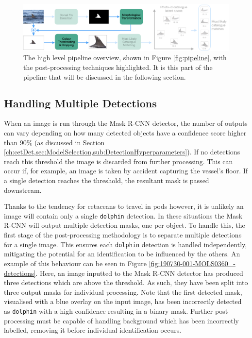 \begin{figure}[!h]
	\begin{center}
		\includegraphics[width=\linewidth]{Chapter3/figs/pipeline-post-processed.png}
	\end{center}
	\caption[The high level pipeline overview, shown in Figure \ref{fig:pipeline}, with the post-processing techniques highlighted.]{The high level pipeline overview, shown in Figure \ref{fig:pipeline}, with the post-processing techniques highlighted. It is this part of the pipeline that will be discussed in the following section.}
	\label{fig:pipeline-post-processed}
\end{figure}

\subsection{Handling Multiple Detections}\label{ch:cetDet,sec:postProcessing,sub:handlingMultipleDetections}

When an image is run through the Mask R-CNN detector, the number of outputs can vary depending on how many detected objects have a confidence score higher than 90\% (as discussed in Section \ref{ch:cetDet,sec:ModelSelection,sub:DetectionHyperparameters}). If no detections reach this threshold the image is discarded from further processing. This can occur if, for example, an image is taken by accident capturing the vessel's floor. If a single detection reaches the threshold, the resultant mask is passed downstream. 

Thanks to the tendency for cetaceans to travel in pods however, it is unlikely an image will contain only a single \texttt{dolphin} detection. In these situations the Mask R-CNN will output multiple detection masks, one per object. To handle this, the first stage of the post-processing methodology is to separate multiple detections for a single image. This ensures each \texttt{dolphin} detection is handled independently, mitigating the potential for an identification to be influenced by the others. An example of this behaviour can be seen in Figure \ref{fig:190730-001-MOLS0360_-detections}. Here, an image inputted to the Mask R-CNN detector has produced three detections which are above the threshold. As such, they have been split into three output masks for individual processing. Note that the first detected mask, visualised with a blue overlay on the input image, has been incorrectly detected as \texttt{dolphin} with a high confidence resulting in a binary mask. Further post-processing must be capable of handling background which has been incorrectly labelled, removing it before individual identification occurs.

